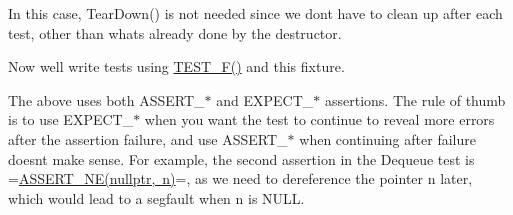 \begin{DoxyCode}{0}
\DoxyCodeLine{  \}}
\DoxyCodeLine{}
\DoxyCodeLine{}
\DoxyCodeLine{\};}
\end{DoxyCode}


In this case, {\ttfamily Tear\+Down()} is not needed since we don\textquotesingle{}t have to clean up after each test, other than what\textquotesingle{}s already done by the destructor.

Now we\textquotesingle{}ll write tests using {\ttfamily \mbox{\hyperlink{googletest-master_2googletest_2include_2gtest_2gtest_8h_a0ee66d464d1a06c20c1929cae09d8758}{T\+E\+S\+T\+\_\+\+F()}}} and this fixture.


\begin{DoxyCode}{0}
\DoxyCodeLine{\}}
\DoxyCodeLine{}
\DoxyCodeLine{}
\DoxyCodeLine{}
\DoxyCodeLine{\}}
\end{DoxyCode}


The above uses both {\ttfamily A\+S\+S\+E\+R\+T\+\_\+$\ast$} and {\ttfamily E\+X\+P\+E\+C\+T\+\_\+$\ast$} assertions. The rule of thumb is to use {\ttfamily E\+X\+P\+E\+C\+T\+\_\+$\ast$} when you want the test to continue to reveal more errors after the assertion failure, and use {\ttfamily A\+S\+S\+E\+R\+T\+\_\+$\ast$} when continuing after failure doesn\textquotesingle{}t make sense. For example, the second assertion in the {\ttfamily Dequeue} test is =\mbox{\hyperlink{_obj__test_2lib_2googletest-release-1_88_81_2googletest_2include_2gtest_2gtest_8h_aa866c8dece57912e6f51495ed3e8d8d5}{A\+S\+S\+E\+R\+T\+\_\+\+N\+E(nullptr, n)}}=, as we need to dereference the pointer {\ttfamily n} later, which would lead to a segfault when {\ttfamily n} is {\ttfamily N\+U\+LL}.

